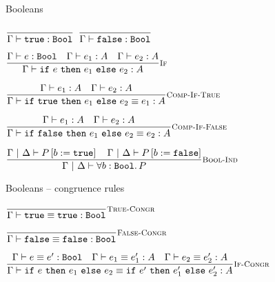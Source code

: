 \documentclass{beamer}
\begin{document}
\begin{frame}{Booleans}

\begin{center}
  $\infrule{}{\typing{\btrue}{\Bool}}$ \quad
  $\infrule{}{\typing{\bfalse}{\Bool}}$

  \vspace{2em}

  $\infrule[If]{\typing{e}{\Bool} \quad \typing{e_1}{A} \quad \typing{e_2}{A}}{\typing{\boolelim{e}{e_1}{e_2}}{A}}$

  \vspace{2em}

  $\infrule[Comp-If-True]{\typing{e_1}{A} \quad \typing{e_2}{A}}{\compeq{\boolelim{\btrue}{e_1}{e_2}}{e_1}{A}}$

  \vspace{2em}

  $\infrule[Comp-If-False]{\typing{e_1}{A} \quad \typing{e_2}{A}}{\compeq{\boolelim{\bfalse}{e_1}{e_2}}{e_2}{A}}$

  \vspace{2em}

  $\infrule[Bool-Ind]{\holds{\subst{P}{b}{\btrue}} \quad \holds{\subst{P}{b}{\bfalse}}}{\holds{\All{b}[\Bool]{P}}}$
\end{center}

\end{frame}

\begin{frame}{Booleans -- congruence rules}

\begin{center}
  $\infrule[True-Congr]{}{\compeq{\btrue}{\btrue}{\Bool}}$

  \vspace{2em}

  $\infrule[False-Congr]{}{\compeq{\bfalse}{\bfalse}{\Bool}}$

  \vspace{2em}

  $\infrule[If-Congr]{\compeq{e}{e'}{\Bool} \quad \compeq{e_1}{e_1'}{A} \quad \compeq{e_2}{e_2'}{A}}{\compeq{\boolelim{e}{e_1}{e_2}}{\boolelim{e'}{e_1'}{e_2'}}{A}}$
\end{center}

\end{frame}

\newcommand{\Nat}{\mathbb{N}}
\newcommand{\zero}{\texttt{zero}}
\renewcommand{\succ}[1][]{\texttt{succ}\ #1}
\newcommand{\natelim}[3]{\texttt{rec}_\Nat\ #1\ #2\ #3}
\end{document}
